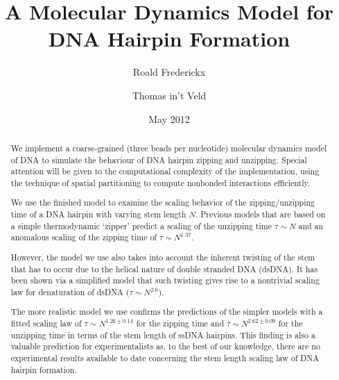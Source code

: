 \documentclass[a4paper, 11pt]{article}
\title{A Molecular Dynamics Model for DNA Hairpin Formation}
\author{Roald Frederickx \and Thomas in't Veld}
\date{May 2012}
\begin{document}
\maketitle

\begin{abstract}
We implement a coarse-grained (three beads per nucleotide) molecular dynamics model of DNA to simulate the behaviour of DNA hairpin zipping and unzipping. Special attention will be given to the computational complexity of the implementation, using the technique of spatial partitioning to compute nonbonded interactions efficiently.

We use the finished model to examine the scaling behavior of the zipping/unzipping time of a DNA hairpin with varying stem length $N$. Previous models that are based on a simple thermodynamic `zipper' predict a scaling of the unzipping time $\tau \sim N$ and an anomalous scaling of the zipping time of $\tau \sim N^{1.37}$. 

However, the model we use also takes into account the inherent twisting of the stem that has to occur due to the helical nature of double stranded DNA (dsDNA). It has been shown via a simplified model that such twisting gives rise to a nontrivial scaling law for denaturation of dsDNA ($\tau \sim N^{2.6}$). 

The more realistic model we use confirms the predictions of the simpler models with a fitted scaling law of $\tau \sim N^{1.26\pm0.14}$ for the zipping time and $\tau \sim N^{2.62\pm0.09}$ for the unzipping time in terms of the stem length of ssDNA hairpins. This finding is also a valuable prediction for experimentalists as, to the best of our knowledge, there are no experimental results available to date concerning the stem length scaling law of DNA hairpin formation.
\end{abstract}
\newpage
\tableofcontents








\footnotesize

	
\end{document}
